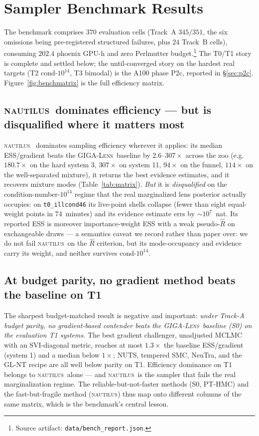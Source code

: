 \documentclass[11pt,letterpaper]{article}
\newcommand{\Rhat}{\ensuremath{\hat{R}}}
\newcommand{\gigalens}{\textsc{GIGA-Lens}}
\newcommand{\nautilus}{\textsc{nautilus}}
\newcommand{\art}[1]{\footnote{Source artifact: \texttt{#1}.}}
\newcommand{\dfile}[1]{\texttt{#1}}
\begin{document}
\section{Sampler Benchmark Results}
\label{sec:benchmark}

The benchmark comprises $370$ evaluation cells (Track~A $345/351$, the six
omissions being pre-registered structured failures, plus $24$ Track~B cells),
consuming $202.4$ phoenix GPU-h and zero Perlmutter budget.\art{data/bench\_report.json}
The T0/T1 story is complete and settled below; the until-converged story on the
hardest real targets (T2 cond-$10^{14}$, T3 bimodal) is the A100 phase P2c,
reported in \S\ref{sec:p2c}. Figure~\ref{fig:benchmatrix} is the full
efficiency matrix.

\subsection{\nautilus\ dominates efficiency --- but is disqualified where it
matters most}

\nautilus\ \citep{lange2023nautilus} dominates sampling efficiency wherever it
applies: its median ESS/gradient beats the \gigalens\ baseline by
$2.6$--$307\times$ across the zoo (e.g.\ $180.7\times$ on the hard
\citet{gu2022gigalens} system 3, $307\times$ on system 11, $94\times$ on the
funnel, $114\times$ on the well-separated mixture), it returns the best
evidence estimates, and it recovers mixture modes (Table~\ref{tab:matrix}).
{\it But} it is {\it disqualified} on the condition-number-$10^{14}$ regime that
the real marginalized lens posterior actually occupies: on \dfile{t0\_illcond46}
its live-point shells collapse (fewer than eight equal-weight points in
$74$~minutes) and its evidence estimate errs by $\sim$$10^{7}$~nat. Its
reported ESS is moreover importance-weight ESS with a weak pseudo-$\Rhat$ on
exchangeable draws --- a semantics caveat we record rather than paper over: we
do not fail \nautilus\ on the $\Rhat$ criterion, but its mode-occupancy and
evidence carry its weight, and neither survives cond-$10^{14}$.

\subsection{At budget parity, no gradient method beats the baseline on T1}

The sharpest budget-matched result is negative and important: {\it under Track-A
budget parity, no gradient-based contender beats the \gigalens\ baseline (S0) on
the evaluation T1 systems.} The best gradient challenger, unadjusted MCLMC with
an SVI-diagonal metric, reaches at most $1.3\times$ the baseline ESS/gradient
(system 1) and a median below $1\times$; NUTS, tempered SMC, NeuTra, and the
GL-NT recipe are all well below parity on T1. Efficiency dominance on T1 belongs
to \nautilus\ alone --- and \nautilus\ is the sampler that fails the real
marginalization regime. The reliable-but-not-faster methods (S0, PT-HMC) and the
fast-but-fragile method (\nautilus) thus map onto different columns of the same
matrix, which is the benchmark's central lesson.
\end{document}
